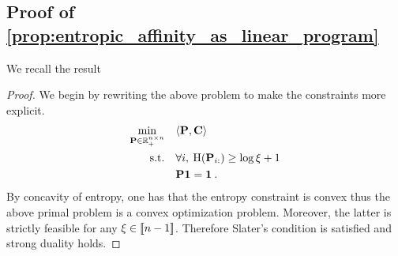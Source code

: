 \subsection{Proof of \cref{prop:entropic_affinity_as_linear_program}}

We recall the result
\entropicaffinityaslinearprogram*

\begin{proof}
We begin by rewriting the above problem to make the constraints more explicit.
\begin{align*}
    \min_{\mathbf{P} \in \mathbb{R}_+^{n \times n}} \quad &\langle \mathbf{P}, \mathbf{C} \rangle \\
    \text{s.t.} \quad &\forall i, \: \operatorname{H}(\mathbf{P}_{i:}) \geq \log{\xi} + 1 \\
    & \mathbf{P} \bm{1} = \bm{1} \:.
\end{align*}
By concavity of entropy, one has that the entropy constraint is convex thus the above primal problem is a convex optimization problem. Moreover, the latter is strictly feasible for any $\xi \in {[\![n-1]\!]}$. Therefore Slater's condition is satisfied and strong duality holds.


\end{proof}
